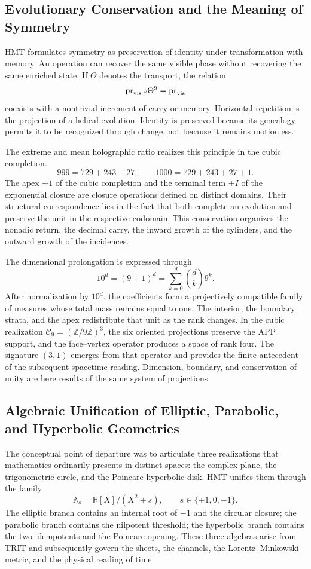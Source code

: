 \subsection*{Evolutionary Conservation and the Meaning of Symmetry}

HMT formulates symmetry as preservation of identity under transformation
with memory. An operation can recover the same visible phase without
recovering the same enriched state. If \(\Theta\) denotes the transport,
the relation
\[
 \operatorname{pr}_{\rm vis}\circ\Theta^9
 =\operatorname{pr}_{\rm vis}
\]
coexists with a nontrivial increment of carry or memory. Horizontal
repetition is the projection of a helical evolution. Identity is
preserved because its genealogy permits it to be recognized through change, not
because it remains motionless.

The extreme and mean holographic ratio realizes this principle in the cubic completion.
\[
 999=729+243+27,\qquad
 1000=729+243+27+1.
\]
The apex \(+1\) of the cubic completion and the terminal term \(+I\) of the
exponential closure are closure operations defined on distinct
domains. Their structural correspondence lies in the fact that both complete an
evolution and preserve the unit in the respective codomain. This conservation
organizes the nonadic return, the decimal carry, the inward growth of
the cylinders, and the outward growth of the incidences.

The dimensional prolongation is expressed through
\[
 10^d=(9+1)^d=\sum_{k=0}^{d}\binom dk9^k.
\]
After normalization by \(10^d\), the coefficients form a projectively compatible
family of measures whose total mass remains equal to one. The
interior, the boundary strata, and the apex redistribute that unit as
the rank changes. In the cubic realization
\(\mathcal C_9=(\mathbb Z/9\mathbb Z)^3\), the six oriented projections
preserve the APP support, and the face--vertex operator produces a space of
rank four. The signature \((3,1)\) emerges from that operator and provides the
finite antecedent of the subsequent spacetime reading. Dimension,
boundary, and conservation of unity are here results of the same system
of projections.

\subsection*{Algebraic Unification of Elliptic, Parabolic, and Hyperbolic Geometries}

The conceptual point of departure was to articulate three realizations that
mathematics ordinarily presents in distinct spaces: the complex plane,
the trigonometric circle, and the Poincare hyperbolic disk. HMT
unifies them through the family
\[
 \mathbb A_s=\mathbb R[X]/(X^2+s),
 \qquad s\in\{+1,0,-1\}.
\]
The elliptic branch contains an internal root of \(-1\) and the circular closure; the
parabolic branch contains the nilpotent threshold; the hyperbolic branch contains
the two idempotents and the Poincare opening. These three algebras arise
from TRIT and subsequently govern the sheets, the channels, the
Lorentz--Minkowski metric, and the physical reading of time.

